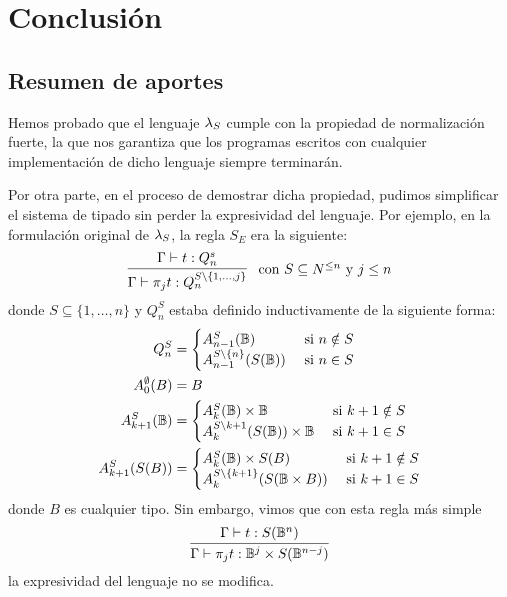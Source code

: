 \chapter{Conclusión}\label{Chapter6}

\section{Resumen de aportes}

Hemos probado que el lenguaje \( \lambda_S \) cumple con la propiedad de normalización fuerte, la que nos garantiza que los programas escritos con cualquier implementación de dicho lenguaje siempre terminarán.

Por otra parte, en el proceso de demostrar dicha propiedad, pudimos simplificar el sistema de tipado sin perder la expresividad del lenguaje. Por ejemplo, en la formulación original de \( \lambda_S \), la regla \( S_E \) era la siguiente:
\[
  \infer[\text{ con } S \subseteq N^{\leq n} \text{ y } j \leq n]{\Gamma \vdash \proj{j}{t} : Q_n^{S \setminus \{1, \ldots, j\}}}{\Gamma \vdash t : Q_n^s}
\]
donde \( S \subseteq \{1, \ldots, n\} \) y \( Q_n^S \) estaba definido inductivamente de la siguiente forma:
\begin{equation*}
  \begin{split}
    Q_n^S & = \begin{cases}
                A_{n - 1}^S(\mathbb{B}) & \text{ si } n \notin S \\
                A_{n - 1}^{S \setminus \{n\}}(S(\mathbb{B})) & \text{ si } n \in S
              \end{cases} \\
    A_0^\emptyset(B) & = B \\
    A_{k + 1}^S(\mathbb{B}) & = \begin{cases}
                                  A_k^S(\mathbb{B}) \times \mathbb{B} & \text{ si } k + 1 \notin S \\
                                  A_k^{S \setminus {k + 1}}(S(\mathbb{B})) \times \mathbb{B} & \text{ si } k + 1 \in S
                                \end{cases} \\
    A_{k + 1}^S(S(B)) & = \begin{cases}
                            A_k^S(\mathbb{B}) \times S(B) & \text{ si } k + 1 \notin S \\
                            A_k^{S \setminus \{k + 1\}} (S(\mathbb{B} \times B)) & \text{ si } k + 1 \in S
                          \end{cases}
  \end{split}
\end{equation*}
donde \( B \) es cualquier tipo.
Sin embargo, vimos que con esta regla más simple
\[
  \infer{\Gamma \vdash \proj{j}{t} : \qubittype^j \times S(\qubittype^{n - j})}{\Gamma \vdash t : S(\qubittype^n)}
\]
la expresividad del lenguaje no se modifica.

